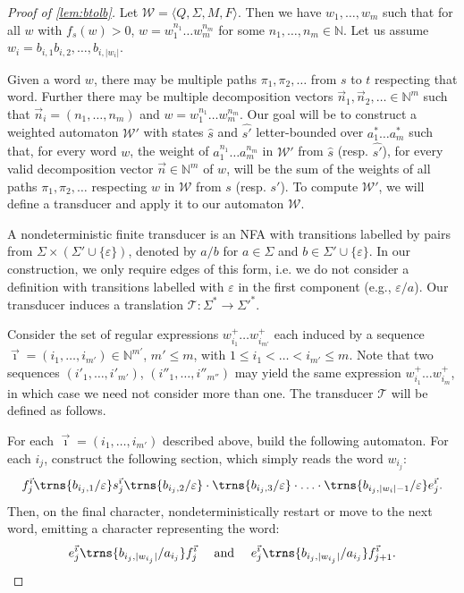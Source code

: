 \documentclass[10pt,a4paper]{amsart}
\numberwithin{equation}{section}
\theoremstyle{plain}
\theoremstyle{definition}
\theoremstyle{remark}
\newcommand\abra[1]{\langle #1 \rangle}
\newcommand\wa{\mathcal{W}}
\renewcommand\nu{f}
\begin{document}
\begin{proof}[Proof of \cref{lem:btolb}]
Let $\wa = \abra{Q,\Sigma,M,F}$. Then we have $w_1,\dots,w_m$ such that for all $w$  with $\nu_s(w) > 0$, $w = w_1^{n_1}\dots w_m^{n_m}$ for some $n_1,\dots,n_m\in \mathbb{N}$. Let us assume $w_i = b_{i,1}b_{i,2},\dots,b_{i,|w_i|}$.

Given a word $w$, there may be multiple paths $\pi_1,\pi_2,\dots$ from $s$ to $t$ respecting that word. Further there may be multiple decomposition vectors $\vec{n}_1,\vec{n}_2,\dots \in \mathbb{N}^m$ such that $\vec{n}_i = (n_1,\dots,n_m)$ and  $w = w_1^{n_1}\dots w_m^{n_m}$. Our goal will be to construct a weighted automaton $\wa'$ with states $\hat{s}$ and $\hat{s'}$ letter-bounded over $a_1^*\dots a_m^*$ such that, for every word $w$,
the weight of $a_1^{n_1}\dots a_m^{n_m}$ in $\wa'$ from $\hat{s}$ (resp. $\hat{s'}$), for every valid decomposition vector $\vec{n} \in \mathbb{N}^m$ of $w$,
will be the sum of the weights of all paths $\pi_1,\pi_2,\dots$ respecting $w$ in $\wa$  from $s$ (resp. $s'$).
To compute $\wa'$, we will define a transducer and apply it to our automaton $\wa$.

A nondeterministic finite transducer is an NFA with transitions labelled by pairs from  $\Sigma \times (\Sigma' \cup \{\varepsilon\})$, denoted by $a/b$  for $a\in\Sigma$ and $b\in\Sigma' \cup \{\varepsilon\}$. In our construction, we only require edges of this form,
i.e. we do not consider a definition with transitions labelled with $\varepsilon $ in the first component (e.g., $\varepsilon/a$).  Our transducer induces a translation $\mathcal{T}: \Sigma^* \to \Sigma'^*$.

Consider the set of regular expressions $w_{i_1}^+\dots w_{i_{m'}}^+$ each induced by a sequence $\vec{\imath}=(i_1,\dots,i_{m'}) \in \mathbb{N}^{m'}$,  $m' \le m $, with $1  \le i_1 < \dots < i_{m'} \le m$. Note that two sequences $(i'_1,\dots,i'_{m'})$, $(i''_1,\dots,i''_{m''})$ may yield the same expression $w_{i_1}^+\dots w_{i_m}^+$, in which case we need not consider more than one. The transducer $\mathcal{T}$ will be defined as follows.

For each $\vec{\imath} = (i_1,\dots,i_{m'})$  described above, build the following automaton. For each $i_j$, construct the following section, which simply reads the word $w_{i_j}$:
\[ f^{\vec{\imath}}_j\trns{b_{i_j,1}/\varepsilon} s^{\vec{\imath}}_j\trns{b_{i_j,2 }/\varepsilon} \cdot \trns{b_{i_j,3 }/\varepsilon} \cdot  \ldots \cdot \trns{b_{i_j,|w_i| -1}/\varepsilon} e^{\vec{\imath}}_j.\]
Then, on the final character, nondeterministically restart or move to the next word, emitting a character representing the word:
\[e^{\vec{\imath}}_j \trns{b_{i_j, |w_{i_j}|}/a_{i_j}} f^{\vec{\imath}}_j \quad \text{ and }\quad  e^{\vec{\imath}}_j \trns{b_{i_j, |w_{i_j}|}/a_{i_j}} f^{\vec{\imath}}_{j+1}.\]


\end{proof}
\end{document}
